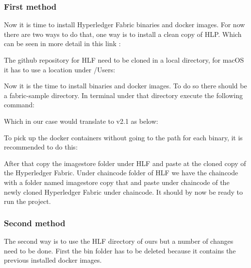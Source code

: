 \subsubsection{First method}
Now it is time to install Hyperledger Fabric binaries and docker images. For now there are two ways to do that, one way is to install a clean copy of HLP. Which can be seen in more detail in this link : 


The github repository for HLF need to be cloned in a local directory, for macOS it has to use a location under /Users:


Now it is the time to install binaries and docker images. To do so there should be a fabric-sample directory. In terminal under that directory execute the following command: 




Which in our case would translate to v2.1 as below: 



To pick up the docker containers without going to the path for each binary, it is recommended to do this: 





After that copy the {\selectfont imagestore} folder under HLF and paste at the cloned copy of the Hyperledger Fabric. Under {\selectfont chaincode} folder of HLF  we have the chaincode with a folder named imagestore copy that and paste under chaincode of the newly cloned Hyperledger Fabric under chaincode. It should by now be ready to run the project. 




\subsubsection{Second method}
The second way is to use the HLF directory of ours but a number of changes need to be done. First the {\selectfont bin} folder has to be deleted because it contains the previous installed docker images. 


